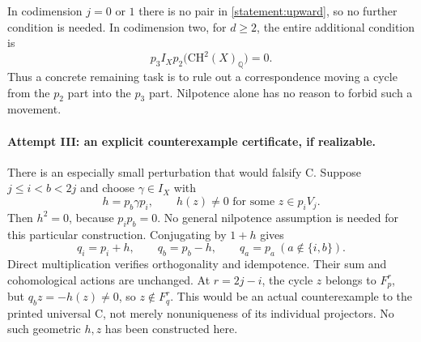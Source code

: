 \documentclass[11pt]{article}
\newcommand{\Q}{\mathbb{Q}}
\begin{document}
In codimension $j=0$ or $1$ there is no pair in
\eqref{statement:upward}, so no further condition is needed.  In codimension two,
for $d\geq2$, the entire additional condition is
\begin{equation}\label{statement:codim-two}
 p_3 I_X p_2\bigl(\mathrm{CH}^2(X)_{\Q}\bigr)=0.
\end{equation}
Thus a concrete remaining task is to rule out a correspondence moving a cycle
from the $p_2$ part into the $p_3$ part.  Nilpotence alone has no reason to
forbid such a movement.

\paragraph{Attempt III: an explicit counterexample certificate, if realizable.}
There is an especially small perturbation that would falsify C.  Suppose
$j\leq i<b<2j$ and choose $\gamma\in I_X$ with
\[
 h=p_b\gamma p_i,
 \qquad h(z)\ne0\text{ for some }z\in p_iV_j.
\]
Then $h^2=0$, because $p_i p_b=0$.  No general nilpotence assumption is
needed for this particular construction.  Conjugating by $1+h$ gives
\begin{equation}\label{statement:elementary-perturbation}
 q_i=p_i+h,\qquad q_b=p_b-h,\qquad q_a=p_a\ (a\notin\{i,b\}).
\end{equation}
Direct multiplication verifies orthogonality and idempotence.  Their sum and
cohomological actions are unchanged.  At $r=2j-i$, the cycle $z$ belongs to
$F_p^r$, but $q_bz=-h(z)\ne0$, so $z\notin F_q^r$.  This would be an actual
counterexample to the printed universal C, not merely nonuniqueness of its
individual projectors.  No such geometric $h,z$ has been constructed here.
\end{document}
